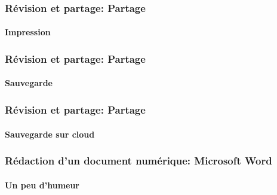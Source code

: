 \documentclass[xcolor=table]{beamer}
\begin{document}
\begin{frame}
\frametitle{Révision et partage: Partage}
\framesubtitle{Impression}

\end{frame}

\begin{frame}
\frametitle{Révision et partage: Partage}
\framesubtitle{Sauvegarde}

\end{frame}

\begin{frame}
\frametitle{Révision et partage: Partage}
\framesubtitle{Sauvegarde sur cloud}
\end{frame}

\begin{frame}
\frametitle{Rédaction d'un document numérique: Microsoft Word}
\framesubtitle{Un peu d'humeur}


\end{frame}


%
%	
%	
\end{document}
